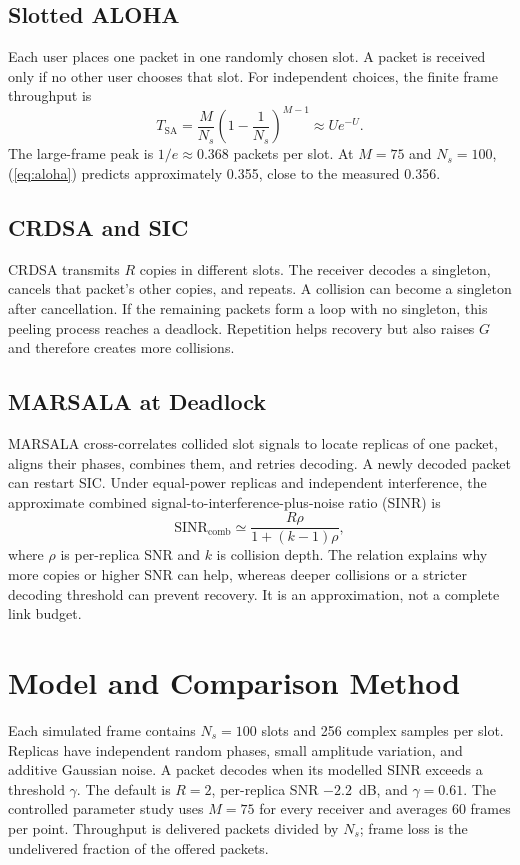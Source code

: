 \documentclass[conference]{IEEEtran}
\begin{document}
\subsection{Slotted ALOHA}
Each user places one packet in one randomly chosen slot. A packet is received
only if no other user chooses that slot. For independent choices, the finite
frame throughput is
\begin{equation}
T_{\mathrm{SA}}=\frac{M}{N_s}\left(1-\frac{1}{N_s}\right)^{M-1}
\approx Ue^{-U}.
\label{eq:aloha}
\end{equation}
The large-frame peak is $1/e\approx0.368$ packets per slot. At $M=75$ and
$N_s=100$, (\ref{eq:aloha}) predicts approximately 0.355, close to the
measured 0.356.

\subsection{CRDSA and SIC}
CRDSA transmits $R$ copies in different slots. The receiver decodes a
singleton, cancels that packet's other copies, and repeats. A collision can
become a singleton after cancellation. If the remaining packets form a loop
with no singleton, this peeling process reaches a deadlock. Repetition helps
recovery but also raises $G$ and therefore creates more collisions.

\subsection{MARSALA at Deadlock}
MARSALA cross-correlates collided slot signals to locate replicas of one
packet, aligns their phases, combines them, and retries decoding. A newly
decoded packet can restart SIC. Under equal-power replicas and independent
interference, the approximate combined signal-to-interference-plus-noise ratio
(SINR) is
\begin{equation}
\mathrm{SINR}_{\mathrm{comb}}\simeq
\frac{R\rho}{1+(k-1)\rho},
\label{eq:sinr}
\end{equation}
where $\rho$ is per-replica SNR and $k$ is collision depth. The relation
explains why more copies or higher SNR can help, whereas deeper collisions or
a stricter decoding threshold can prevent recovery. It is an approximation,
not a complete link budget.

\section{Model and Comparison Method}
Each simulated frame contains $N_s=100$ slots and 256 complex samples per
slot. Replicas have independent random phases, small amplitude variation,
and additive Gaussian noise. A packet decodes when its modelled SINR exceeds
a threshold $\gamma$. The default is $R=2$, per-replica SNR $-2.2$~dB, and
$\gamma=0.61$. The controlled parameter study uses $M=75$ for every receiver
and averages 60 frames per point. Throughput is delivered packets divided by
$N_s$; frame loss is the undelivered fraction of the offered packets.
\end{document}
